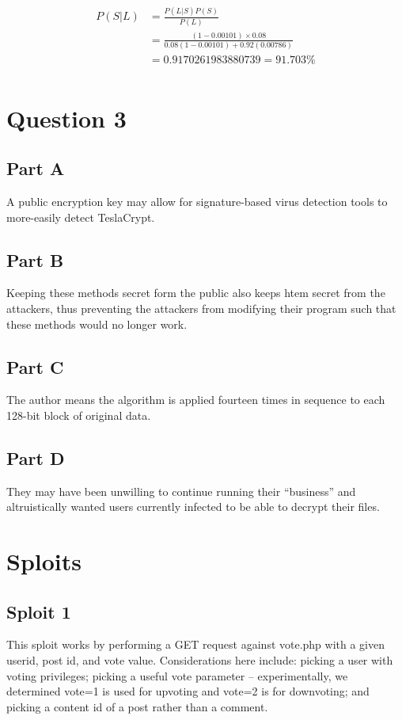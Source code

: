 \documentclass[12pt]{article}
\begin{document}
\begin{align*}
P(S|L) &= \frac{P(L|S)P(S)}{P(L)} \\
       &= \frac{(1 - 0.00101) \times 0.08}{0.08(1 - 0.00101) + 0.92(0.00786)} \\
       &= 0.9170261983880739 = 91.703\% \\
\end{align*}

\section*{Question 3}
\subsection*{Part A}
A public encryption key may allow for signature-based virus detection tools to more-easily detect TeslaCrypt.

\subsection*{Part B}
Keeping these methods secret form the public also keeps htem secret from the attackers, thus preventing the attackers from modifying their program such that these methods would no longer work.

\subsection*{Part C}
The author means the algorithm is applied fourteen times in sequence to each 128-bit block of original data.

\subsection*{Part D}
They may have been unwilling to continue running their ``business'' and altruistically wanted users currently infected to be able to decrypt their files.

\section*{Sploits}
\subsection*{Sploit 1}
This sploit works by performing a GET request against vote.php with a given userid, post id, and vote value. Considerations here include: picking a user with voting privileges; picking a useful vote parameter -- experimentally, we determined vote=1 is used for upvoting and vote=2 is for downvoting; and picking a content id of a post rather than a comment.
\end{document}
